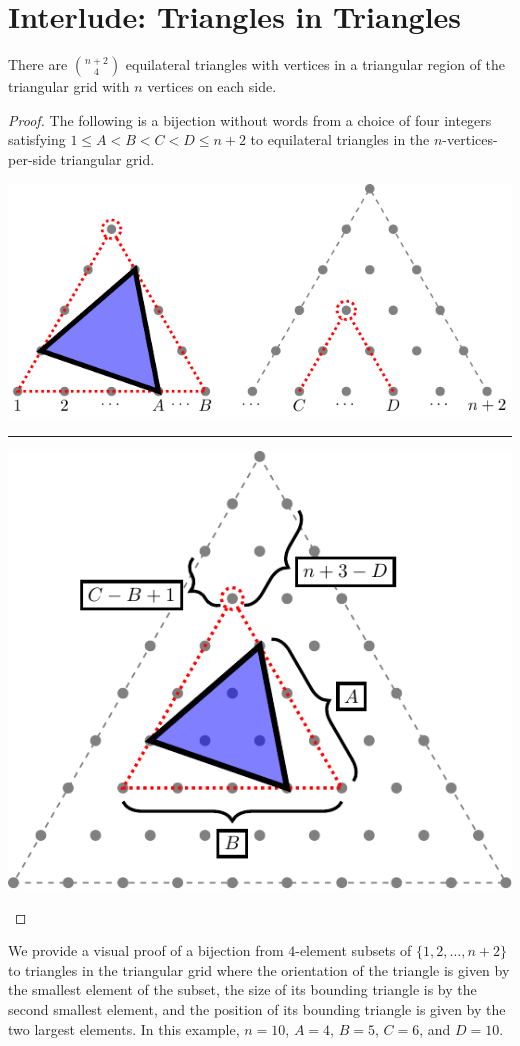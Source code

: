 \chapter{Interlude: Triangles in Triangles}
\label{cha:TrianglesInTriangles}
There are $\binom{n+2}{4}$ equilateral triangles with vertices in a triangular
region of the triangular grid with $n$ vertices on each side.
\begin{proof}
The following is a bijection without words from a choice of four integers
satisfying $1 \leq A < B < C < D \leq n + 2$
to equilateral triangles in the $n$-vertices-per-side triangular grid.

\noindent
\begin{center}
  \includegraphics[scale=0.7]{figures/TrianglesInTriangles/assets/triangles_in_triangles_subset}
  \rule{\textwidth}{0.4pt}
  \vspace{0.5em}

  \includegraphics[scale=0.7]{figures/TrianglesInTriangles/assets/triangles_in_triangles}
\end{center}
\end{proof}
\begin{note}
  We provide a visual proof of a bijection from $4$-element subsets of
  $\{1, 2, \dots, n + 2\}$ to triangles in the triangular grid where
  the orientation of the triangle is given by the smallest element of the subset,
  the size of its bounding triangle is by the second smallest element,
  and the position of its bounding triangle is given by the two largest elements.
  In this example, $n=10$, $A = 4$, $B = 5$, $C=6$, and $D=10$.
\end{note}

